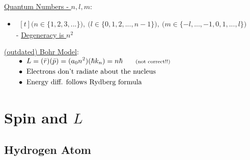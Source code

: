 \documentclass[12pt]{article}
\begin{document}
\vspace{20pt} \noindent
\underline{Quantum Numbers - \(n,l,m\)}:
\begin{itemize}
\item \( \begin{gathered}[t]
        \Big( n \in \{ 1, 2, 3, ... \} \Big), \ 
        \Big( l \in \{ 0, 1, 2, ..., n-1 \} \Big), \
        \Big( m \in \{ -l, ..., -1, 0, 1, ..., l \} \Big)
    \end{gathered} \)\\[10pt]
    - \underline{Degeneracy is \(n^2\)}
\end{itemize}      

\vspace{10pt}\noindent
\underline{(outdated) Bohr Model}:\\[10pt]
\(\begin{aligned}
    \hspace{18pt} &\bullet \ L = ( \bar{r} ) ( \bar{p} ) = (a_0 n^2) (\hbar k_n) 
        = n\hbar \hspace{18pt} \text{\scriptsize(not correct!!)}\\
    \hspace{18pt} &\bullet \ \text{Electrons don't radiate about the nucleus}\\
    \hspace{18pt} &\bullet \ \text{Energy diff. follows Rydberg formula}
\end{aligned}\)


\newpage
\section{Spin and \(L\)}
\subsection{Hydrogen Atom}
\end{document}
